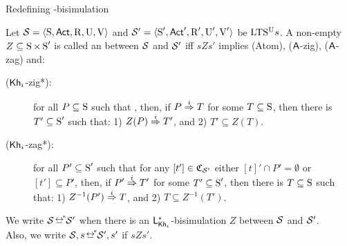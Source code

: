\documentclass{beamer}
\begin{document}
\begin{frame}{Redefining \KHilogic-bisimulation}

    \begin{footnotesize}
    \begin{definition}
        Let $\mathcal{S} = \langle \operatorname{S},{\rm \sf Act},\operatorname{R},\operatorname{U},\operatorname{V} \rangle$ and $\mathcal{S}' = \langle \operatorname{S}',{\rm \sf Act}',\operatorname{R}',\operatorname{U}',\operatorname{V}' \rangle$ be ${\textup{LTS$^\text{\textup{U}}$}}s$. 
        A non-empty $Z \subseteq \operatorname{S} \times \operatorname{S}'$ is called an  between $\mathcal{S}$ and $\mathcal{S}'$ iff $sZs'$ implies (Atom), (${\operatorname{\sf A}}$-zig), (${\operatorname{\sf A}}$-zag) and:
        \pause
        \begin{description} 
            \item[(${\operatorname{\sf Kh}_i}$-zig*):] 
            for all $P\subseteq\operatorname{S}$ such that {}, then, 
            if $P \stackrel{i}{\Rightarrow} T$ for some $T \subseteq \operatorname{S}$, then there is $T' \subseteq \operatorname{S}'$ such that: 
                1) $Z(P) \stackrel{i}{\Rightarrow} T'$, and
                2) $T' \subseteq Z(T)$.\pause
                
            \item[(${\operatorname{\sf Kh}_i}$-zag*):] for all $P'\subseteq\operatorname{S}'$ such that {\color{NavyBlue}for any $[t']\in\mathfrak{C}_{\mathcal{S}'}$ either 
            $[t]'\cap P' =\emptyset$ or $[t']\subseteq P'$}, then, 
            if $P' \stackrel{i}{\Rightarrow} T'$ for some $T' \subseteq \operatorname{S}'$, then there is $T \subseteq \operatorname{S}$ such that: 
                1) $Z^{-1}(P') \stackrel{i}{\Rightarrow} T$, and
                2) $T \subseteq Z^{-1}(T')$.\pause

        \end{description}
        We write $\model \nbisim \model'$ when there is an
        $\mathsf{L}_{\operatorname{\sf Kh}_i}^*$-bisimulation $Z$ between $\mathcal{S}$ and $\mathcal{S}'$. \\Also, we write $\model,s \nbisim \model',s'$ if
        $sZs'$.
    \end{definition}
\end{footnotesize}
\end{frame}

\end{document}
